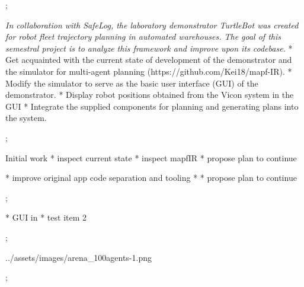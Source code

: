 

\worktype[B/EN]

\slideshow



\pg;


\textit {
    In collaboration with SafeLog, the laboratory demonstrator TurtleBot was created
    for robot fleet trajectory planning in automated warehouses. The goal of this semestral
    project is to analyze this framework and improve upon its codebase.
}
\begitems
* Get acquainted with the current state of development of the demonstrator and the simulator for multi-agent planning (https://github.com/Kei18/mapf-IR).
* Modify the simulator to serve as the basic user interface (GUI) of the demonstrator.
* Display robot positions obtained from the Vicon system in the GUI
* Integrate the supplied components for planning and generating plans into the system.
\enditems
\nl

\pg;



Initial work
\begitems
* inspect current state
* inspect mapfIR
* propose plan to continue
\enditems


\begitems
* improve original app code separation and tooling
* 
* propose plan to continue
\enditems

\pg;


\begitems
* GUI in 
* test item 2
\enditems
\nl

\pg;



\centerline{\picw=14cm \inspic ../assets/images/arena_100agents-1.png }

\pg;


\midinsert
\endinsert

